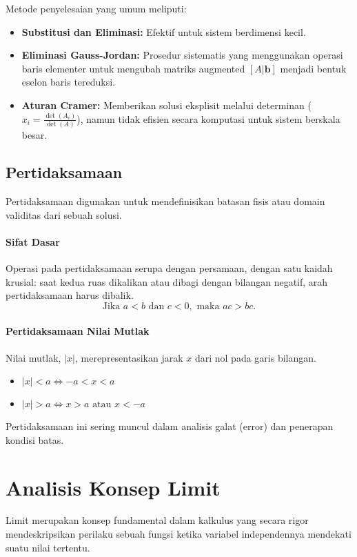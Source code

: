 \documentclass[12pt, a4paper]{article}
\begin{document}
Metode penyelesaian yang umum meliputi:
\begin{itemize}
    \item \textbf{Substitusi dan Eliminasi:} Efektif untuk sistem berdimensi kecil.
    \item \textbf{Eliminasi Gauss-Jordan:} Prosedur sistematis yang menggunakan operasi baris elementer untuk mengubah matriks augmented $[A|\mathbf{b}]$ menjadi bentuk eselon baris tereduksi.
    \item \textbf{Aturan Cramer:} Memberikan solusi eksplisit melalui determinan ($x_i = \frac{\det(A_i)}{\det(A)}$), namun tidak efisien secara komputasi untuk sistem berskala besar.
\end{itemize}

\subsection{Pertidaksamaan}
Pertidaksamaan digunakan untuk mendefinisikan batasan fisis atau domain validitas dari sebuah solusi.

\paragraph{Sifat Dasar}
Operasi pada pertidaksamaan serupa dengan persamaan, dengan satu kaidah krusial: saat kedua ruas dikalikan atau dibagi dengan bilangan negatif, arah pertidaksamaan harus dibalik.
\[
\text{Jika } a < b \text{ dan } c < 0, \text{ maka } ac > bc.
\]

\paragraph{Pertidaksamaan Nilai Mutlak}
Nilai mutlak, $|x|$, merepresentasikan jarak $x$ dari nol pada garis bilangan.
\begin{itemize}
    \item $|x| < a \iff -a < x < a$
    \item $|x| > a \iff x > a \text{ atau } x < -a$
\end{itemize}
Pertidaksamaan ini sering muncul dalam analisis galat (error) dan penerapan kondisi batas.

\section{Analisis Konsep Limit}
Limit merupakan konsep fundamental dalam kalkulus yang secara rigor mendeskripsikan perilaku sebuah fungsi ketika variabel independennya mendekati suatu nilai tertentu.
\end{document}
